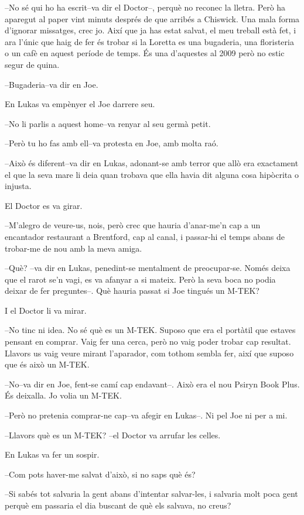 --No sé qui ho ha escrit--va dir el Doctor--, perquè no reconec la
lletra. Però ha aparegut al paper vint minuts després de que arribés a
Chiswick. Una mala forma d'ignorar missatges, crec jo. Així que ja has
estat salvat, el meu treball està fet, i ara l'únic que haig de fer és
trobar si la Loretta es una bugaderia, una floristeria o un cafè en
aquest període de temps. És una d'aquestes al 2009 però no estic segur
de quina.

--Bugaderia--va dir en Joe.

En Lukas va empènyer el Joe darrere seu.

--No li parlis a aquest home--va renyar al seu germà petit.

--Però tu ho fas amb ell--va protesta en Joe, amb molta raó.

--Això és diferent--va dir en Lukas, adonant-se amb terror que allò era
exactament el que la seva mare li deia quan trobava que ella havia dit
alguna cosa hipòcrita o injusta.

El Doctor es va girar.

--M'alegro de veure-us, nois, però crec que hauria d'anar-me'n cap a un
encantador restaurant a Brentford, cap al canal, i passar-hi el temps
abans de trobar-me de nou amb la meva amiga.

--Què? --va dir en Lukas, penedint-se mentalment de preocupar-se. Només
deixa que el rarot se'n vagi, es va afanyar a si mateix. Però la seva
boca no podia deixar de fer preguntes--. Què hauria passat si Joe
tingués un M-TEK?

I el Doctor li va mirar.

--No tinc ni idea. No sé què es un M-TEK. Suposo que era el portàtil que
estaves pensant en comprar. Vaig fer una cerca, però no vaig poder
trobar cap resultat. Llavors us vaig veure mirant l'aparador, com tothom
sembla fer, així que suposo que és això un M-TEK.

--No--va dir en Joe, fent-se camí cap endavant--. Això era el nou Psiryn
Book Plus. És deixalla. Jo volia un M-TEK.

--Però no pretenia comprar-ne cap--va afegir en Lukas--. Ni pel Joe ni
per a mi.

--Llavors què es un M-TEK? --el Doctor va arrufar les celles.

En Lukas va fer un sospir.

--Com pots haver-me salvat d'això, si no saps què és?

--Si sabés tot salvaria la gent abans d'intentar salvar-les, i salvaria
molt poca gent perquè em passaria el dia buscant de què els salvava, no
creus?

